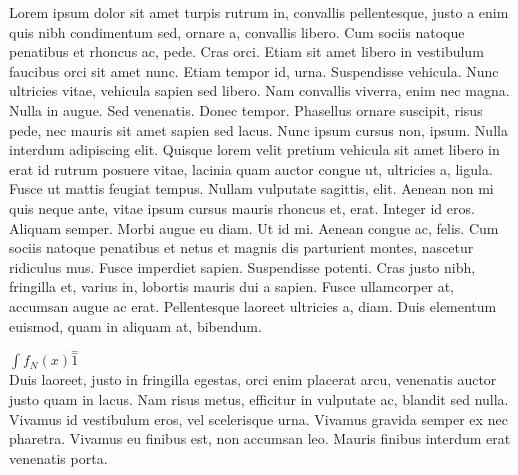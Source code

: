 \documentclass{article}
\begin{document}
Lorem ipsum dolor sit amet turpis rutrum in, convallis pellentesque, justo a enim quis nibh condimentum sed, ornare a, convallis libero. Cum sociis natoque penatibus et rhoncus ac, pede. Cras orci. Etiam sit amet libero in vestibulum faucibus orci sit amet nunc. Etiam tempor id, urna. Suspendisse vehicula. Nunc ultricies vitae, vehicula sapien sed libero. Nam convallis viverra, enim nec magna. Nulla in augue. Sed venenatis. Donec tempor. Phasellus ornare suscipit, risus pede, nec mauris sit amet sapien sed lacus. Nunc ipsum cursus non, ipsum. Nulla interdum adipiscing elit. Quisque lorem velit pretium vehicula sit amet libero in erat id rutrum posuere vitae, lacinia quam auctor congue ut, ultricies a, ligula. Fusce ut mattis feugiat tempus. Nullam vulputate sagittis, elit. Aenean non mi quis neque ante, vitae ipsum cursus mauris rhoncus et, erat. Integer id eros. Aliquam semper. Morbi augue eu diam. Ut id mi. Aenean congue ac, felis. Cum sociis natoque penatibus et netus et magnis dis parturient montes, nascetur ridiculus mus. Fusce imperdiet sapien. Suspendisse potenti. Cras justo nibh, fringilla et, varius in, lobortis mauris dui a sapien. Fusce ullamcorper at, accumsan augue ac erat. Pellentesque laoreet ultricies a, diam. Duis elementum euismod, quam in aliquam at, bibendum.

\begin{math}
	\int f_N(x) \stackrel{=} 1
\end{math}\\
Duis laoreet, justo in fringilla egestas, orci enim placerat arcu, venenatis auctor justo quam in lacus. Nam risus metus, efficitur in vulputate ac, blandit sed nulla. Vivamus id vestibulum eros, vel scelerisque urna. Vivamus gravida semper ex nec pharetra. Vivamus eu finibus est, non accumsan leo. Mauris finibus interdum erat venenatis porta. 
\end{document}
